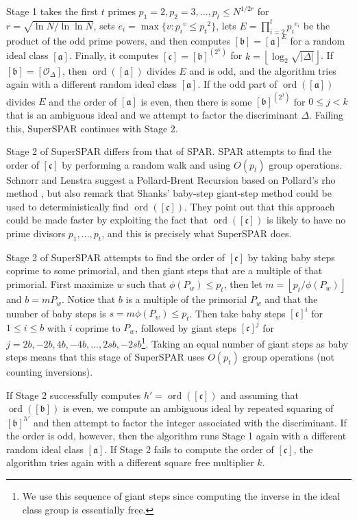 \documentclass{ucalgthes1}
\theoremstyle{definition}
\DeclareMathOperator{\ord}{ord}
\newcommand{\floor}[1]{\left\lfloor #1 \right\rfloor}
\newcommand{\ideal}{\mathfrak}
\newcommand{\idealclass}[1]{\left[ \ideal #1 \right]}
\newcommand{\aclass}{\idealclass a}
\newcommand{\bclass}{\idealclass b}
\newcommand{\cclass}{\idealclass c}
\newcommand{\idclass}{[\mathcal O_\Delta]}
\begin{document}
Stage 1 takes the first $t$ primes $p_1 = 2, p_2 = 3, ..., p_t \le N^{1/2r}$ for $r = \sqrt{\ln N / \ln \ln N}$, sets $e_i = \max \{ v : {p_i}^v \le {p_t}^2 \}$, lets $E = \prod_{i=2}^t {p_i}^{e_i}$ be the product of the odd prime powers, and then computes $\bclass = \aclass^E$ for a random ideal class $\aclass$.  Finally, it computes $\cclass = {\bclass}^{\left(2^k\right)}$ for $k=\floor{\log_2 \sqrt{|\Delta|}}$.  If $\bclass = \idclass$, then $\ord(\aclass)$ divides $E$ and is odd, and the algorithm tries again with a different random ideal class $\aclass$.  If the odd part of $\ord(\aclass)$ divides $E$ and the order of $\aclass$ is even, then there is some $\bclass^{\left( 2^j \right)}$ for $0 \le j < k$ that is an ambiguous ideal and we attempt to factor the discriminant $\Delta$.  Failing this, SuperSPAR continues with Stage 2.

Stage 2 of SuperSPAR differs from that of SPAR.  SPAR attempts to find the order of $\cclass$ by performing a random walk and using $O(p_t)$ group operations.  Schnorr and Lenstra \cite[p.294]{Schnorr1984} suggest a Pollard-Brent Recursion \cite{Brent1980} based on Pollard's rho method \cite{Pollard1975}, but also remark \cite[p.298]{Schnorr1984} that Shanks' baby-step giant-step method \cite{Shanks1971} could be used to deterministically find $\ord(\cclass)$.  They point out that this approach could be made faster by exploiting the fact that $\ord(\cclass)$ is likely to have no prime divisors $p_1, ..., p_t$, and this is precisely what SuperSPAR does.

Stage 2 of SuperSPAR attempts to find the order of $\cclass$ by taking baby steps coprime to some primorial, and then giant steps that are a multiple of that primorial.  First maximize $w$ such that $\phi(P_w) \le p_t$, then let $m = \floor{p_t / \phi(P_w)}$ and $b = mP_w$.  Notice that $b$ is a multiple of the primorial $P_w$ and that the number of baby steps is $s = m \phi(P_w) \le p_t$.  Then take baby steps $\cclass^i$ for $1 \le i \le b$ with $i$ coprime to $P_w$, followed by giant steps $\cclass^j$ for $j=2b,-2b,4b,-4b,...,2sb,-2sb$\footnote{We use this sequence of giant steps since computing the inverse in the ideal class group is essentially free.}.  Taking an equal number of giant steps as baby steps means that this stage of SuperSPAR uses $O(p_t)$ group operations (not counting inversions).

If Stage 2 successfully computes $h' = \ord(\cclass)$ and assuming that $\ord(\bclass)$ is even, we compute an ambiguous ideal by repeated squaring of $\bclass^{h'}$ and then attempt to factor the integer associated with the discriminant.  If the order is odd, however, then the algorithm runs Stage 1 again with a different random ideal class $\aclass$.  If Stage 2 fails to compute the order of $\cclass$, the algorithm tries again with a different square free multiplier $k$.
\end{document}
